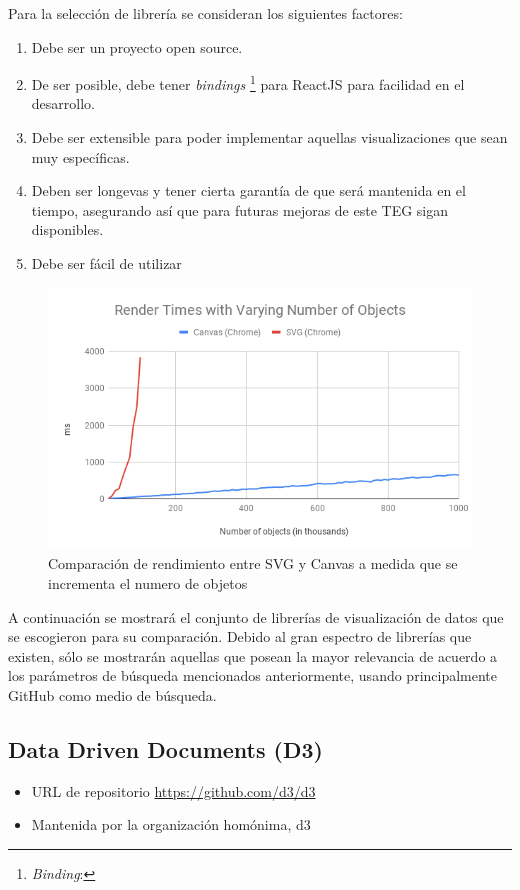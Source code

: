Para la selección de librería se consideran los siguientes factores:

\begin{enumerate}
    \item {Debe ser un proyecto open source.}
    \item {De ser posible, debe tener \textit{bindings} \footnote{\textit{Binding}: } para ReactJS para facilidad en el desarrollo.}
    \item {Debe ser extensible para poder implementar aquellas visualizaciones que sean muy específicas.}
    \item {Deben ser longevas y tener cierta garantía de que será mantenida en el tiempo,
    asegurando así que para futuras mejoras de este TEG sigan disponibles.}
    \item {Debe ser fácil de utilizar}
\end{enumerate}

\begin{figure}[H]
    \centering
    \includegraphics[width=\textwidth]{seminario/images/svg-vs-canvas.png}
    \caption{Comparación de rendimiento entre SVG y Canvas a medida que se incrementa el numero de objetos}
    \label{fig:canvasvssvg}
\end{figure}

A continuación se mostrará el conjunto de librerías de visualización de datos que se escogieron para su comparación. Debido al gran espectro de librerías que existen, sólo se mostrarán aquellas que posean la mayor relevancia de acuerdo a los parámetros de búsqueda mencionados anteriormente, usando principalmente GitHub como medio de búsqueda.

\subsection{ Data Driven Documents (D3) }
\begin{itemize}
    \item URL de repositorio \href{https://github.com/d3/d3}{https://github.com/d3/d3}
    \item Mantenida por la organización homónima, d3
\end{itemize}

